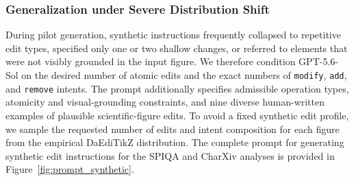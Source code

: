 \subsubsection{Generalization under Severe Distribution Shift}
\label{subsubsec:Generalization under Severe Distribution Shift}
During pilot generation, synthetic instructions frequently collapsed to repetitive edit types, specified only one or two shallow changes, or referred to elements that were not visibly grounded in the input figure. We therefore condition GPT-5.6-Sol on the desired number of atomic edits and the exact numbers of \texttt{modify}, \texttt{add}, and \texttt{remove} intents. The prompt additionally specifies admissible operation types, atomicity and visual-grounding constraints, and nine diverse human-written examples of plausible scientific-figure edits. To avoid a fixed synthetic edit profile, we sample the requested number of edits and intent composition for each figure from the empirical DaEdiTikZ distribution. The complete prompt for generating synthetic edit instructions for the SPIQA and CharXiv analyses is provided in Figure~\ref{fig:prompt_synthetic}.
